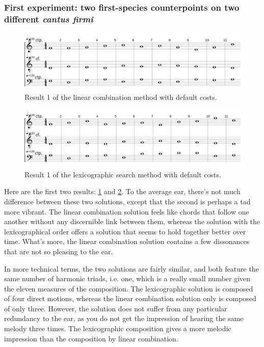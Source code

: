 \subsubsection{First experiment: two first-species counterpoints on two different \textit{cantus firmi}}
\begin{figure}[h]
    \centering
    \includegraphics[width=1\textwidth]{Images/Experiments/linear-combination-1sp.png}
    \caption{Result 1 of the linear combination method with default costs.}
    \label{fig:combili-1sp}
\end{figure}

\begin{figure}[h]
    \centering
    \includegraphics[width=1\textwidth]{Images/Experiments/basic-lexico-1sp.png}
    \caption{Result 1 of the lexicographic search method with default costs.}
    \label{fig:lexico-1sp}
\end{figure}

Here are the first two results: \ref{fig:combili-1sp} and \ref{fig:lexico-1sp}. To the average ear, there's not much difference between these two solutions, except that the second is perhaps a tad more vibrant. The linear combination solution feels like chords that follow one another without any discernible link between them, whereas the solution with the lexicographical order offers a solution that seems to hold together better over time. What's more, the linear combination solution contains a few dissonances that are not so pleasing to the ear.

In more technical terms, the two solutions are fairly similar, and both feature the same number of harmonic triads, i.e. one, which is a really small number given the eleven measures of the composition. The lexicographic solution is composed of four direct motions, whereas the linear combination solution only is composed of only three. However, the solution does not suffer from any particular redundancy to the ear, as you do not get the impression of hearing the same melody three times. The lexicographic composition gives a more melodic impression than the composition by linear combination.

